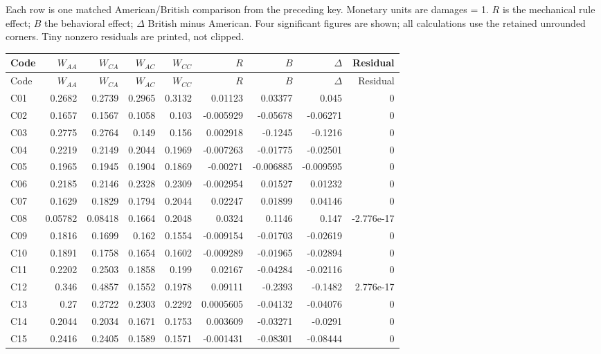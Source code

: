 \documentclass[10pt]{article}
\begin{document}
Each row is one matched American/British comparison from the preceding key. Monetary units are damages = 1. $R$ is the mechanical rule effect; $B$ the behavioral effect; $\Delta$ British minus American. Four significant figures are shown; all calculations use the retained unrounded corners. Tiny nonzero residuals are printed, not clipped.\par\medskip
\small\setlength{\tabcolsep}{6pt}\begin{longtable}{@{}lrrrrrrrr@{}}
\toprule Code & $W_{AA}$ & $W_{CA}$ & $W_{AC}$ & $W_{CC}$ & $R$ & $B$ & $\Delta$ & Residual\\\midrule\endfirsthead
\toprule Code & $W_{AA}$ & $W_{CA}$ & $W_{AC}$ & $W_{CC}$ & $R$ & $B$ & $\Delta$ & Residual\\\midrule\endhead\bottomrule\endfoot
C01 & 0.2682 & 0.2739 & 0.2965 & 0.3132 & 0.01123 & 0.03377 & 0.045 & 0\\[1pt]
C02 & 0.1657 & 0.1567 & 0.1058 & 0.103 & -0.005929 & -0.05678 & -0.06271 & 0\\[1pt]
C03 & 0.2775 & 0.2764 & 0.149 & 0.156 & 0.002918 & -0.1245 & -0.1216 & 0\\[1pt]
C04 & 0.2219 & 0.2149 & 0.2044 & 0.1969 & -0.007263 & -0.01775 & -0.02501 & 0\\[1pt]
C05 & 0.1965 & 0.1945 & 0.1904 & 0.1869 & -0.00271 & -0.006885 & -0.009595 & 0\\[1pt]
C06 & 0.2185 & 0.2146 & 0.2328 & 0.2309 & -0.002954 & 0.01527 & 0.01232 & 0\\[1pt]
C07 & 0.1629 & 0.1829 & 0.1794 & 0.2044 & 0.02247 & 0.01899 & 0.04146 & 0\\[1pt]
C08 & 0.05782 & 0.08418 & 0.1664 & 0.2048 & 0.0324 & 0.1146 & 0.147 & -2.776e-17\\[1pt]
C09 & 0.1816 & 0.1699 & 0.162 & 0.1554 & -0.009154 & -0.01703 & -0.02619 & 0\\[1pt]
C10 & 0.1891 & 0.1758 & 0.1654 & 0.1602 & -0.009289 & -0.01965 & -0.02894 & 0\\[1pt]
C11 & 0.2202 & 0.2503 & 0.1858 & 0.199 & 0.02167 & -0.04284 & -0.02116 & 0\\[1pt]
C12 & 0.346 & 0.4857 & 0.1552 & 0.1978 & 0.09111 & -0.2393 & -0.1482 & 2.776e-17\\[1pt]
C13 & 0.27 & 0.2722 & 0.2303 & 0.2292 & 0.0005605 & -0.04132 & -0.04076 & 0\\[1pt]
C14 & 0.2044 & 0.2034 & 0.1671 & 0.1753 & 0.003609 & -0.03271 & -0.0291 & 0\\[1pt]
C15 & 0.2416 & 0.2405 & 0.1589 & 0.1571 & -0.001431 & -0.08301 & -0.08444 & 0\\[1pt]

\end{longtable}
\end{document}
